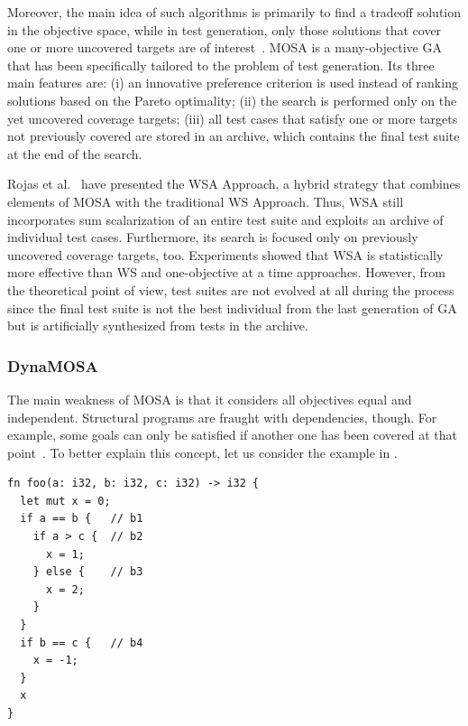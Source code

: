 \documentclass[paper=a4,%
  twoside,%
  BCOR4mm,%
  abstract=true,%
  toc=bibliography,%
  chapterprefix=true,%
  toc=bibliographynumbered,%
  open=right,%
  english,%
  pagesize=pdftex]{scrreprt}
\begin{document}
Moreover, the main idea of such algorithms is primarily to find a tradeoff solution in the objective space, while in test generation, only those solutions that cover one or more uncovered targets are of interest~\cite{Panichella2018}. \ac{MOSA} is a many-objective \ac{GA} that has been specifically tailored to the problem of test generation. Its three main features are: (i) an innovative preference criterion is used instead of ranking solutions based on the Pareto optimality; (ii) the search is performed only on the yet uncovered coverage targets; (iii) all test cases that satisfy one or more targets not previously covered are stored in an archive, which contains the final test suite at the end of the search.

Rojas et al.~\cite{Rojas2017} have presented the \ac{WSA} Approach, a hybrid strategy that combines elements of \ac{MOSA} with the traditional \ac{WS} Approach. Thus, \ac{WSA} still incorporates sum scalarization of an entire test suite and exploits an archive of individual test cases. Furthermore, its search is focused only on previously uncovered coverage targets, too. Experiments showed that \ac{WSA} is statistically more effective than \ac{WS} and one-objective at a time approaches. However, from the theoretical point of view, test suites are not evolved at all during the process since the final test suite is not the best individual from the last generation of \ac{GA} but is artificially synthesized from tests in the archive.

\subsubsection{DynaMOSA}
The main weakness of \ac{MOSA} is that it considers all objectives equal and independent. Structural programs are fraught with dependencies, though. For example, some goals can only be satisfied if another one has been covered at that point~\cite{Fraser_2013}. To better explain this concept, let us consider the example in .

\begin{lstlisting}[style=boxed, caption={A nested function with control dependent blocks}, label=lst:example-control-dependencies]
fn foo(a: i32, b: i32, c: i32) -> i32 {
  let mut x = 0;
  if a == b {   // b1
    if a > c {  // b2
      x = 1;
    } else {    // b3
      x = 2;
    }
  }
  if b == c {   // b4
    x = -1;
  }
  x
}
\end{lstlisting}
\end{document}
